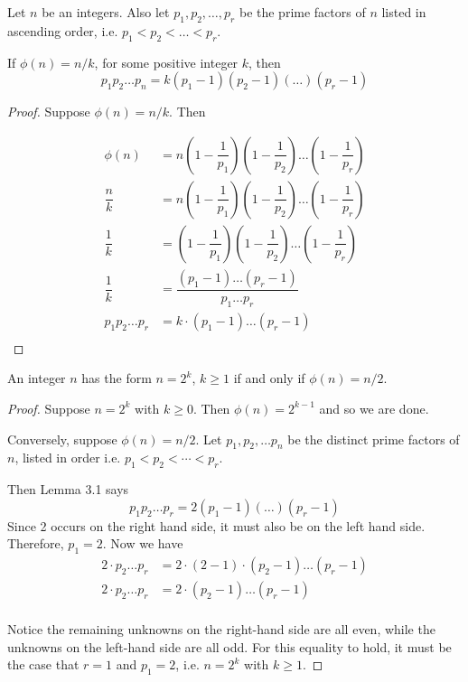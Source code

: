 
\begin{lemma}
    Let $n$ be an integers. Also let $p_1, p_2, \ldots, p_r$ be the prime
    factors of $n$ listed in ascending order, i.e. $p_1 < p_2 < \ldots < p_r$.
    
    If $\phi(n) = n/k$, for some positive integer $k$, then
    \[p_1 p_2 \ldots p_n = k(p_1 - 1)(p_2 - 1)(\ldots)(p_r - 1) \]
\end{lemma}
\begin{proof}
    Suppose $\phi(n) = n/k$. Then

    \begin{align*}
        \phi(n) &= n \left( 1 - \dfrac{1}{p_1} \right) \left( 1 - \dfrac{1}{p_2} \right) \dots \left( 1 - \dfrac{1}{p_r} \right) \\
        \dfrac{n}{k} &= n \left( 1 - \dfrac{1}{p_1} \right) \left( 1 - \dfrac{1}{p_2} \right) \dots \left( 1 - \dfrac{1}{p_r} \right) \\
        \dfrac{1}{k} &= \left( 1 - \dfrac{1}{p_1} \right) \left( 1 - \dfrac{1}{p_2} \right) \dots \left( 1 - \dfrac{1}{p_r} \right) \\
        \dfrac{1}{k} &= \dfrac{(p_1 - 1) \dots (p_r - 1)}{p_1 \dots p_r} \\
        p_1 p_2 \dots p_r &= k \cdot (p_1 - 1) \dots (p_r - 1) \\
    \end{align*}
\end{proof}

\begin{prop}[11.12a]
    An integer $n$ has the form $n=2^k$, $k \geq 1$ if and only if 
    $\phi(n) = n/2$.
\end{prop}
\begin{proof}
    Suppose $n=2^k$ with $k \geq 0$. Then $\phi(n) = 2^{k-1}$ and so we are
    done.
    
    Conversely, suppose $\phi(n)=n/2$. Let $p_1, p_2, \dots p_n$ be the distinct
    prime factors of $n$, listed in order i.e. $p_1 < p_2 < \cdots < p_r$.
    
    Then Lemma 3.1 says
    \[ p_1 p_2 \ldots p_r = 2 (p_1 - 1)(\ldots)(p_r - 1) \]
    Since 2 occurs on the right hand side, it must also be on the left hand
    side. Therefore, $p_1 = 2$. Now we have
    \begin{align*}
    2 \cdot p_2 \dots p_r &= 2 \cdot (2 - 1) \cdot (p_2 - 1) \dots (p_r - 1) \\
    2 \cdot p_2 \dots p_r &= 2 \cdot (p_2 - 1) \dots (p_r - 1) \\
    \end{align*}
    
    Notice the remaining unknowns on the right-hand side are all even, while
    the unknowns on the left-hand side are all odd. For this equality to hold,
    it must be the case that $r=1$ and $p_1 = 2$, i.e. $n=2^k$ with $k \geq 1$.
\end{proof}


